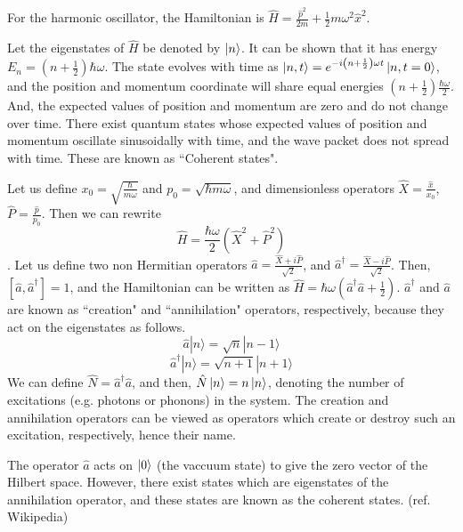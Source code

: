 \documentclass[12pt, twoside]{article}
\begin{document}
For the harmonic oscillator, the Hamiltonian is $\hat{H} = \frac{\hat{p}^2}{2m} + \frac{1}{2}m \omega^2 {\hat{x}}^2$.


Let the eigenstates of $\hat{H}$ be denoted by $\ket{n}$. It can be shown \cite{cohen_tannoudji} that it has energy $E_n = (n+\frac{1}{2}) \hbar\omega$. The state evolves with time as $\ket{n,t} = e ^ { -i \left( n + \frac { 1 } { 2 } \right) \omega t } \ket{n,t=0}$, and the position and momentum coordinate will share equal energies $(n+\frac{1}{2}) \frac{\hbar\omega}{2}$. And, the expected values of position and momentum are zero and do not change over time.
There exist quantum states whose expected values of position and momentum oscillate sinusoidally with time, and the wave packet does not spread with time. These are known as ``Coherent states".


Let us define $x_0 = \sqrt{\frac{\hbar}{m\omega}}$ and $p_0 = \sqrt{\hbar m \omega}$, and dimensionless operators $\hat{X} = \frac{\hat{x}}{x_0}$,$\hat{P} = \frac{\hat{p}}{p_0}$. Then we can rewrite \begin{equation}\label{eq:Hamiltonian}\hat{H} = \frac{\hbar\omega}{2}({\hat{X}}^2 + {\hat{P}}^2)\end{equation}. Let us define two non Hermitian operators $\hat{a} = \frac{\hat{X} + i \hat{P}}{\sqrt{2}}$, and ${\hat{a}}^\dagger = \frac{\hat{X} - i \hat{P}}{\sqrt{2}}$. Then, $[\hat{a},\hat{a}^\dagger] = 1$, and the Hamiltonian can be written as $\hat{H} = \hbar\omega( \hat{a}^\dagger \hat{a} + \frac{1}{2})$.
$\hat{a}^\dagger$ and $\hat{a}$ are known as ``creation" and ``annihilation" operators, respectively, because they act on the eigenstates as follows. 
\begin{equation}\label{eq:a} { \hat{a} | n \rangle = \sqrt { n } | n - 1 \rangle } \end{equation}
\begin{equation} \label{eq:adagger}{ \hat{a} ^ { \dagger } | n \rangle = \sqrt { n + 1 } | n + 1 \rangle }\end{equation} 
We can define $\hat{N} = \hat{a}^\dagger\hat{a}$, and then, $\hat{N} \ket{n} = n\ket{n}$, denoting the number of excitations (e.g. photons or phonons) in the system. The creation and annihilation operators can be viewed as operators which create or destroy such an excitation, respectively, hence their name.

The operator $\hat{a}$ acts on $\ket{0}$ (the vaccuum state) to give the zero vector of the Hilbert space. However, there exist states which are eigenstates of the annihilation operator, and these states are known as the coherent states. (ref. Wikipedia)\cite{test}
\end{document}

